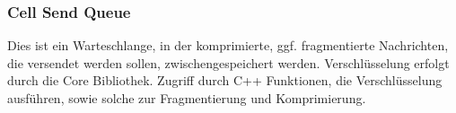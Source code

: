 \subsubsection{Cell Send Queue}
Dies ist ein Warteschlange, in der komprimierte, ggf. fragmentierte Nachrichten, die versendet werden sollen, zwischengespeichert werden. 
Verschlüsselung erfolgt durch die Core Bibliothek.
Zugriff durch C++ Funktionen, die Verschlüsselung ausführen, sowie solche zur Fragmentierung und Komprimierung.
